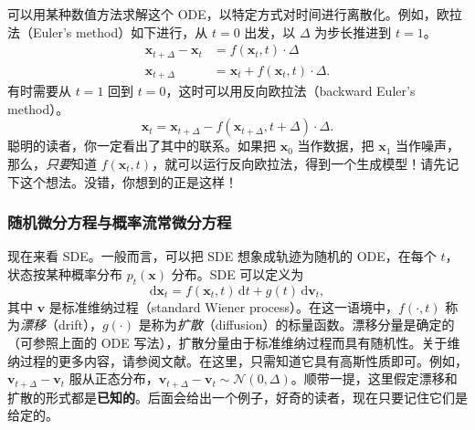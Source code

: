 可以用某种数值方法求解这个 ODE，以特定方式对时间进行离散化。例如，欧拉法（Euler's method）如下进行，从 $t=0$ 出发，以 $\Delta$ 为步长推进到 $t=1$。
\begin{align}
  \mathbf x_{t+\Delta}-\mathbf x_t&=f(\mathbf x_t,t)\cdot\Delta
    \tag{9.22}\label{eq:09-22}\\
  \mathbf x_{t+\Delta}&=\mathbf x_t+f(\mathbf x_t,t)\cdot\Delta.
    \tag{9.23}\label{eq:09-23}
\end{align}
有时需要从 $t=1$ 回到 $t=0$，这时可以用反向欧拉法（backward Euler's method）。
\begin{equation}
  \mathbf x_t=\mathbf x_{t+\Delta}-f(\mathbf x_{t+\Delta},t+\Delta)\cdot\Delta.
  \tag{9.24}\label{eq:09-24}
\end{equation}
聪明的读者，你一定看出了其中的联系。如果把 $\mathbf x_0$ 当作数据，把 $\mathbf x_1$ 当作噪声，那么，\emph{只要}知道 $f(\mathbf x_t,t)$，就可以运行反向欧拉法，得到一个生成模型！请先记下这个想法。没错，你想到的正是这样！

\subsubsection{随机微分方程与概率流常微分方程}

现在来看 SDE。一般而言，可以把 SDE 想象成轨迹为随机的 ODE，在每个 $t$，状态按某种概率分布 $p_t(\mathbf x)$ 分布。SDE 可以定义为
\begin{equation}
  \mathrm d\mathbf x_t=f(\mathbf x_t,t)\,\mathrm dt+g(t)\,\mathrm d\mathbf v_t,
  \tag{9.25}\label{eq:09-25}
\end{equation}
其中 $\mathbf v$ 是标准维纳过程（standard Wiener process）。在这一语境中，$f(\cdot,t)$ 称为\emph{漂移}（drift），$g(\cdot)$ 是称为\emph{扩散}（diffusion）的标量函数。漂移分量是确定的（可参照上面的 ODE 写法），扩散分量由于标准维纳过程而具有随机性。关于维纳过程的更多内容，请参阅文献。在这里，只需知道它具有高斯性质即可。例如，$\mathbf v_{t+\Delta}-\mathbf v_t$ 服从正态分布，$\mathbf v_{t+\Delta}-\mathbf v_t\sim\mathcal N(0,\Delta)$。顺带一提，这里假定漂移和扩散的形式都是\textbf{已知的}。后面会给出一个例子，好奇的读者，现在只要记住它们是给定的。

